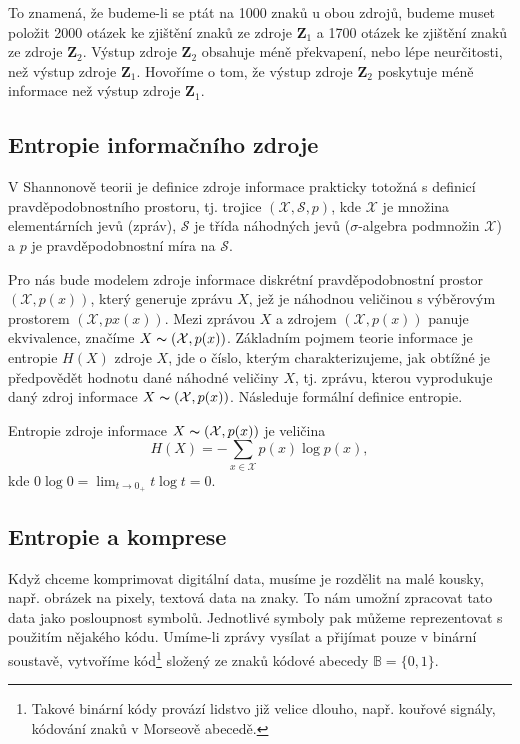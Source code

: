 To znamená, že budeme-li se ptát na 1000 znaků u obou zdrojů, budeme muset položit 2000 otázek ke zjištění znaků ze zdroje $\mathbf{Z}_1$ a 1700 otázek ke zjištění znaků ze zdroje $\mathbf{Z}_2$. Výstup zdroje $\mathbf{Z}_2$ obsahuje méně překvapení, nebo lépe neurčitosti, než výstup zdroje $\mathbf{Z}_1$. Hovoříme o tom, že výstup zdroje $\mathbf{Z}_2$ poskytuje méně informace než výstup zdroje $\mathbf{Z}_1$.

\subsection{Entropie informačního zdroje}
V Shannonově teorii je definice zdroje informace prakticky totožná s definicí pravděpodobnostního prostoru, tj. trojice $(\mathcal{X},\mathcal{S},p)$, kde $\mathcal{X}$ je množina elementárních jevů (zpráv), $\mathcal{S}$ je třída náhodných jevů ($\sigma$-algebra podmnožin $\mathcal{X}$) a $p$ je pravděpodobnostní míra na $\mathcal{S}$. \cite{teorieInformace}

Pro nás bude modelem zdroje informace diskrétní pravděpodobnostní prostor $(\mathcal{X},p(x))$, který generuje zprávu $X$, jež je náhodnou veličinou s výběrovým prostorem $(\mathcal{X}, px(x))$. Mezi zprávou $X$ a zdrojem $(\mathcal{X}, p(x))$ panuje ekvivalence, značíme $X \thicksim (\mathcal{X}, p(x))$. Základním pojmem teorie informace je entropie $H(X)$ zdroje $X$, jde o číslo, kterým charakterizujeme, jak obtížné je předpovědět hodnotu dané náhodné veličiny $X$, tj. zprávu, kterou vyprodukuje daný zdroj informace $X \thicksim (\mathcal{X}, p(x))$. Následuje formální definice entropie. \cite{teorieInformace}

\begin{defi}
Entropie zdroje informace $X \thicksim (\mathcal{X}, p(x))$ je veličina $$H(X) = -\sum_{x \in \mathcal{X}} p(x)\log p(x),$$ kde $0 \log 0 = \lim_{t \to 0_+} t \log t = 0$.
\end{defi}

\subsection{Entropie a komprese}
Když chceme komprimovat digitální data, musíme je rozdělit na malé kousky, např. obrázek na pixely, textová data na znaky. To nám umožní zpracovat tato data jako posloupnost symbolů. Jednotlivé symboly pak můžeme reprezentovat s použitím nějakého kódu. Umíme-li zprávy vysílat a přijímat pouze v binární soustavě, vytvoříme kód\footnote{Takové binární kódy provází lidstvo již velice dlouho, např. kouřové signály, kódování znaků v Morseově abecedě.} složený ze znaků kódové abecedy $\mathbb{B} = \{0,1\}$.

